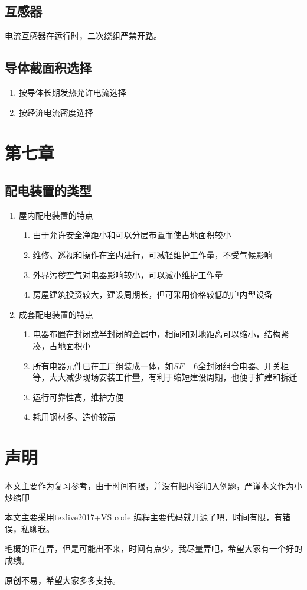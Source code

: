 \documentclass[UTF8]{ctexart}
\begin{document}
\subsection{互感器}
\par 电流互感器在运行时，二次绕组严禁开路。
\subsection{导体截面积选择}
\begin{enumerate}[1.]
    \item 按导体长期发热允许电流选择
    \item 按经济电流密度选择    
\end{enumerate}
\section{第七章}
\subsection{配电装置的类型}
\begin{enumerate}[(1)]
    \item 屋内配电装置的特点
    \begin{enumerate}[(1)]
        \item 由于允许安全净距小和可以分层布置而使占地面积较小
        \item 维修、巡视和操作在室内进行，可减轻维护工作量，不受气候影响
        \item 外界污秽空气对电器影响较小，可以减小维护工作量
        \item 房屋建筑投资较大，建设周期长，但可采用价格较低的户内型设备
    \end{enumerate}
    \item 成套配电装置的特点
    \begin{enumerate}[(1)]
        \item 电器布置在封闭或半封闭的金属中，相间和对地距离可以缩小，结构紧凑，占地面积小
        \item 所有电器元件已在工厂组装成一体，如$SF-{6}$全封闭组合电器、开关柜等，大大减少现场安装工作量，有利于缩短建设周期，也便于扩建和拆迁
        \item 运行可靠性高，维护方便
        \item 耗用钢材多、造价较高
    \end{enumerate}
\end{enumerate}
\clearpage 
\section*{声明}
\par  本文主要作为复习参考，由于时间有限，并没有把内容加入例题，严谨本文作为小炒缩印
\par  本文主要采用texlive2017+VS code 编程主要代码就开源了吧，时间有限，有错误，私聊我。
\par  毛概的正在弄，但是可能出不来，时间有点少，我尽量弄吧，希望大家有一个好的成绩。
\par  原创不易，希望大家多多支持。
\end{document}
